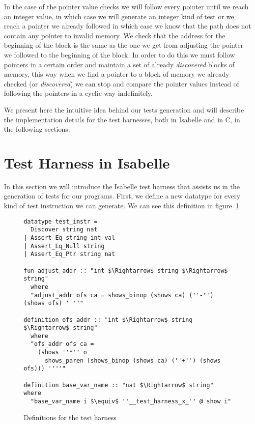 In the case of the pointer value checks we will follow every pointer until we reach an integer value, in which case we will generate an integer kind of test or we reach a pointer we already followed in which case we know that the path does not contain any pointer to invalid memory.
We check that the address for the beginning of the block is the same as the one we get from adjusting the pointer we followed to the beginning of the block.
In order to do this we must follow pointers in a certain order and maintain a set of already \textit{discovered} blocks of memory, this way when we find a pointer to a block of memory we already checked (or \textit{discovered}) we can stop and compare the pointer values instead of following the pointers in a cyclic way indefinitely.

We present here the intuitive idea behind our tests generation and will describe the implementation details for the test harnesses, both in Isabelle and in C, in the following sections.

\section{Test Harness in Isabelle}

In this section we will introduce the Isabelle test harness that assists us in the generation of tests for our programs.
First, we define a new datatype for every kind of test instruction we can generate.
We can see this definition in figure~\ref{fig:test_harness_datatype}.


\begin{figure}
\begin{lstlisting}[mathescape=true]
datatype test_instr =
  Discover string nat
| Assert_Eq string int_val
| Assert_Eq_Null string
| Assert_Eq_Ptr string nat

fun adjust_addr :: "int $\Rightarrow$ string $\Rightarrow$ string"
  where
  "adjust_addr ofs ca = shows_binop (shows ca) (''-'') (shows ofs) ''''"

definition ofs_addr :: "int $\Rightarrow$ string $\Rightarrow$ string"
  where
  "ofs_addr ofs ca =
    (shows ''*'' o
      shows_paren (shows_binop (shows ca) (''+'') (shows ofs))) ''''"

definition base_var_name :: "nat $\Rightarrow$ string" where
  "base_var_name i $\equiv$ ''__test_harness_x_'' @ show i"
\end{lstlisting}

\caption{Definitions for the test harness}
\label{fig:test_harness_datatype}
\end{figure}


